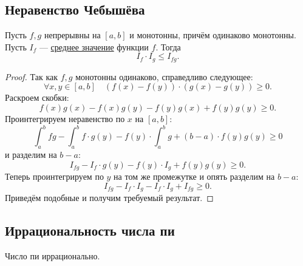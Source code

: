 \subsection{Неравенство Чебышёва}

\begin{theorem}
	Пусть \(f, g\) непрерывны на \([a, b]\) и монотонны, причём одинаково монотонны. Пусть \(I_f\) --- \hyperlink{average}{среднее значение} функции \(f\). Тогда \[
		I_f \cdot I_g \leqslant I_{fg}.
	\]
\end{theorem}

\begin{proof}
	Так как \(f, g\) монотонны одинаково, справедливо следующее: \[
		\forall x, y \in [a, b] \quad (f(x) - f(y)) \cdot (g(x) - g(y)) \geqslant 0.
	\]
	Раскроем скобки: \[
		f(x)g(x) - f(x)g(y) - f(y)g(x) + f(y)g(y) \geqslant 0.
	\]
	Проинтегрируем неравенство по \(x\) на \([a, b]\): \[
		\int_a^b fg - \int_a^b f \cdot g(y) - f(y) \cdot \int_a^b g + (b - a) \cdot f(y)g(y) \geqslant 0
	\]
	и разделим на \(b - a\): \[
		I_{fg} - I_f \cdot g(y) - f(y) \cdot I_g + f(y)g(y) \geqslant 0.
	\]
	Теперь проинтегрируем по \(y\) на том же промежутке и опять разделим на \(b - a\): \[
		I_{fg} - I_f \cdot I_g - I_f \cdot I_g + I_{fg} \geqslant 0.
	\]
	Приведём подобные и получим требуемый результат.
\end{proof}

\subsection{Иррациональность числа пи}


\begin{theorem}
	Число пи иррационально.
\end{theorem}

